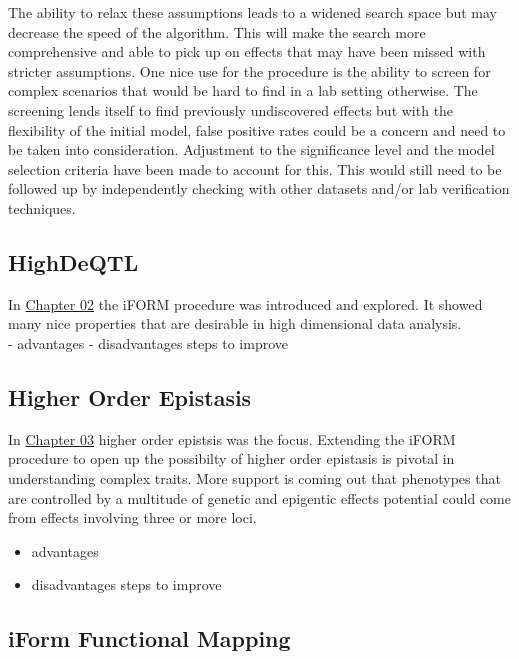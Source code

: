 \documentclass[11pt,]{book}
\providecommand{\tightlist}{%
  \setlength{\itemsep}{0pt}\setlength{\parskip}{0pt}}
\theoremstyle{definition}
\theoremstyle{definition}
\theoremstyle{remark}
\begin{document}
The ability to relax these assumptions leads to a widened search space
but may decrease the speed of the algorithm. This will make the search
more comprehensive and able to pick up on effects that may have been
missed with stricter assumptions. One nice use for the procedure is the
ability to screen for complex scenarios that would be hard to find in a
lab setting otherwise. The screening lends itself to find previously
undiscovered effects but with the flexibility of the initial model,
false positive rates could be a concern and need to be taken into
consideration. Adjustment to the significance level and the model
selection criteria have been made to account for this. This would still
need to be followed up by independently checking with other datasets
and/or lab verification techniques.

\subsection{HighDeQTL}\label{highdeqtl-1}

In \protect\hyperlink{highdeqtl}{Chapter 02} the iFORM procedure was
introduced and explored. It showed many nice properties that are
desirable in high dimensional data analysis.\\
- advantages - disadvantages steps to improve

\subsection{Higher Order Epistasis}\label{higher-order-epistasis-1}

In \protect\hyperlink{higherorder}{Chapter 03} higher order epistsis was
the focus. Extending the iFORM procedure to open up the possibilty of
higher order epistasis is pivotal in understanding complex traits. More
support is coming out that phenotypes that are controlled by a multitude
of genetic and epigentic effects potential could come from effects
involving three or more loci.

\begin{itemize}
\tightlist
\item
  advantages
\item
  disadvantages steps to improve
\end{itemize}

\subsection{iForm Functional Mapping}\label{iform-functional-mapping}
\end{document}
